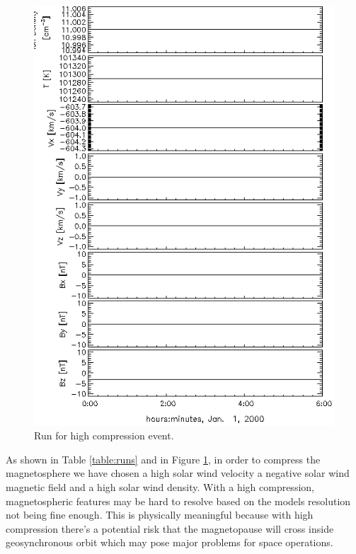\begin{figure}
	\centering
	\includegraphics[scale=0.5]{images/Run3.png}
	\caption{Run for high compression event.}
    \label{fig:highcompression}
	\figSpace
\end{figure}

As shown in Table \ref{table:runs} and in Figure \ref{fig:highcompression}, in
order to compress the magnetosphere we have chosen a high solar wind velocity a
negative solar wind magnetic field and a high solar wind density. With a high
compression, magnetospheric features may be hard to resolve based on the models
resolution not being fine enough. This is physically meaningful because with
high compression there's a potential risk that the magnetopause will cross
inside geosynchronous orbit which may pose major problems for space operations.

